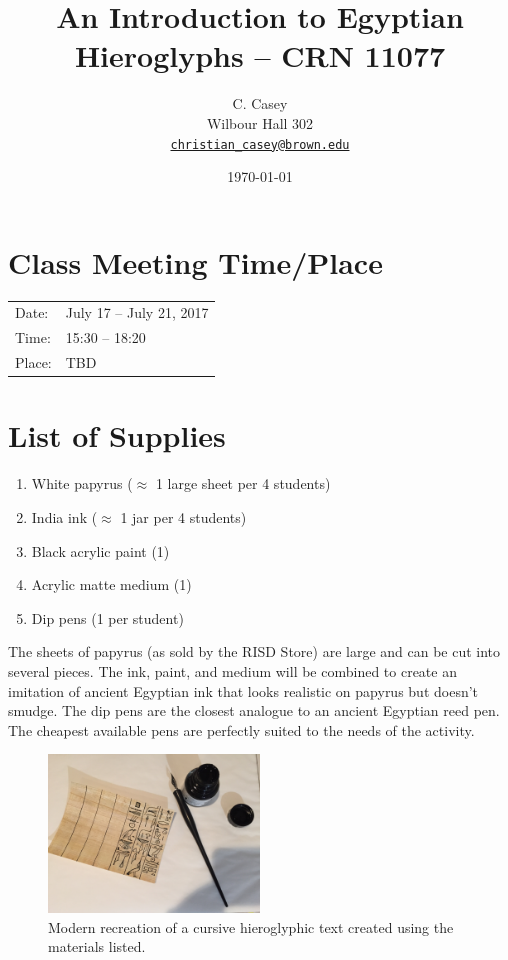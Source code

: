 \documentclass[11pt]{article}
\begin{document}
	
	\title{An Introduction to Egyptian Hieroglyphs -- CRN 11077}
	\author{C. Casey \\
		Wilbour Hall 302 \\
  		\texttt{\href{mailto:christian_casey@brown.edu}{christian\_casey@brown.edu}}}
	\date{\today}
	\maketitle
	
	\section*{Class Meeting Time/Place}
	
		\begin{tabular}{l l}
		Date: & July 17 – July 21, 2017 \\
		Time: & 15:30 – 18:20 \\
		Place: & TBD
		\end{tabular} 
		
	\section*{List of Supplies}
		\begin{enumerate}
			\item White papyrus ($\approx$ 1 large sheet per 4 students)
			\item India ink ($\approx$ 1 jar per 4 students)
			\item Black acrylic paint (1)
			\item Acrylic matte medium (1)
			\item Dip pens (1 per student)
		\end{enumerate}
		
		The sheets of papyrus (as sold by the RISD Store) are large and can be cut into several pieces.
		The ink, paint, and medium will be combined to create an imitation of ancient Egyptian ink that looks realistic on papyrus but doesn't smudge.
		The dip pens are the closest analogue to an ancient Egyptian reed pen. 
		The cheapest available pens are perfectly suited to the needs of the activity.
		
		
		\begin{figure}[!h]
		\centering
		\includegraphics[width=0.5\textwidth]{cursive}
		\caption{Modern recreation of a cursive hieroglyphic text created using the materials listed.}
		\end{figure}
		
\end{document}

